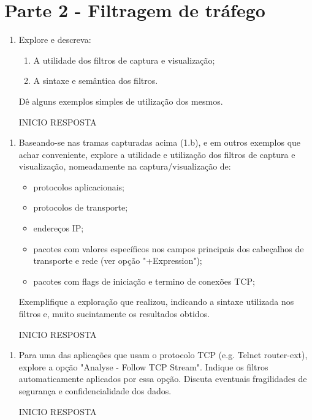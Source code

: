 \documentclass{llncs}
\begin{document}
\section{Parte 2 - Filtragem de tráfego}

\begin{enumerate}[\textbf{a)}]
  \item Explore e descreva:
  \begin{enumerate}[i]
    \item A utilidade dos filtros de captura e visualização;    
    \item A sintaxe e semântica dos filtros.
  \end{enumerate}
  \par Dê alguns exemplos simples de utilização dos mesmos.

  \begin{flushleft}
    INICIO RESPOSTA    
  \end{flushleft}
\end{enumerate}


\begin{enumerate}[\textbf{b)}]
  \item  Baseando-se nas tramas capturadas acima (1.b), e em outros exemplos que achar conveniente, explore a
  utilidade e utilização dos filtros de captura e visualização, nomeadamente na captura/visualização de:
  \begin{itemize}
    \item protocolos aplicacionais;
    \item protocolos de transporte;
    \item endereços IP;
    \item pacotes com valores específicos nos campos principais dos cabeçalhos de transporte e rede (ver opção
    "+Expression");
    \item pacotes com flags de iniciação e termino de conexões TCP;
  \end{itemize}
  \par Exemplifique a exploração que realizou, indicando a sintaxe utilizada nos filtros e, muito sucintamente os
  resultados obtidos.
  \begin{flushleft}
    INICIO RESPOSTA
  \end{flushleft}
\end{enumerate}


\begin{enumerate}[\textbf{c)}]
  \item Para uma das aplicações que usam o protocolo TCP (e.g. Telnet router-ext), explore a opção "Analyse - Follow TCP Stream". Indique os filtros automaticamente aplicados por essa opção. Discuta eventuais fragilidades
  de segurança e confidencialidade dos dados.
  \begin{flushleft}
    INICIO RESPOSTA    
  \end{flushleft} 
\end{enumerate}
\end{document}
